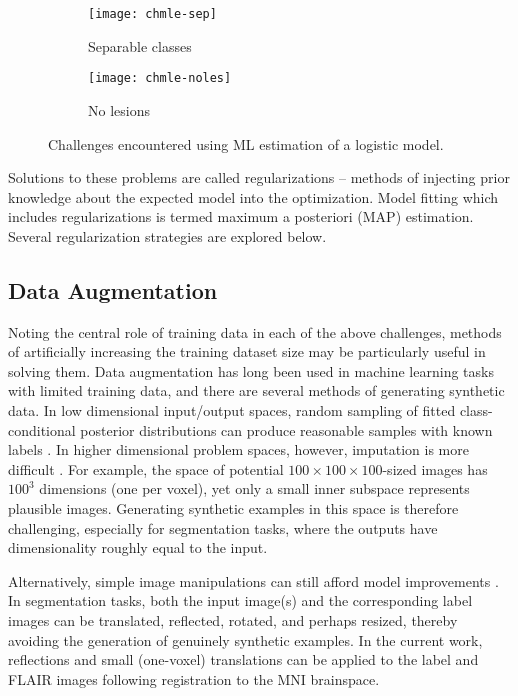 \begin{figure}
  \centering
  \begin{subfigure}{\plotwidth}
    \texttt{[image: chmle-sep]}\caption{Separable classes}\label{fig:chmle-sep}
  \end{subfigure}
  \begin{subfigure}{\plotwidth}
    \texttt{[image: chmle-noles]}\caption{No lesions}\label{fig:chmle-noles}
  \end{subfigure}
  \caption{Challenges encountered using ML estimation of a logistic model.}
  \label{fig:chmle}
\end{figure}
Solutions to these problems are called regularizations -- methods of injecting prior knowledge about the expected model into the optimization. Model fitting which includes regularizations is termed maximum a posteriori (MAP) estimation. Several regularization strategies are explored below.
\subsection{Data Augmentation}
Noting the central role of training data in each of the above challenges, methods of artificially increasing the training dataset size may be particularly useful in solving them. Data augmentation has long been used in machine learning tasks with limited training data, and there are several methods of generating synthetic data. In low dimensional input/output spaces, random sampling of fitted class-conditional posterior distributions can produce reasonable samples with known labels \cite{Tanner1987}. In higher dimensional problem spaces, however, imputation is more difficult \cite{Goodfellow2014}. For example, the space of potential $100\times100\times100$-sized images has $100^3$ dimensions (one per voxel), yet only a small inner subspace represents plausible images. Generating synthetic examples in this space is therefore challenging, especially for segmentation tasks, where the outputs have dimensionality roughly equal to the input.
\par
Alternatively, simple image manipulations can still afford model improvements \cite{Krizhevsky2012}. In segmentation tasks, both the input image(s) and the corresponding label images can be translated, reflected, rotated, and perhaps resized, thereby avoiding the generation of genuinely synthetic examples. In the current work, reflections and small (one-voxel) translations can be applied to the label and FLAIR images following registration to the MNI brainspace.
